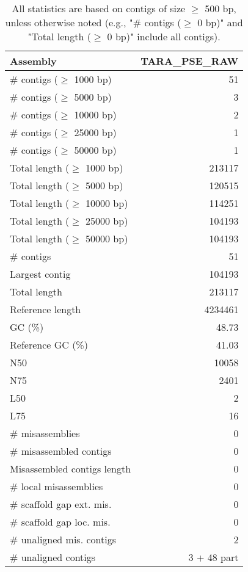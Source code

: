 \documentclass[12pt,a4paper]{article}
\begin{document}
\begin{table}[ht]
\begin{center}
\caption{All statistics are based on contigs of size $\geq$ 500 bp, unless otherwise noted (e.g., "\# contigs ($\geq$ 0 bp)" and "Total length ($\geq$ 0 bp)" include all contigs).}
\begin{tabular}{|l*{1}{|r}|}
\hline
Assembly & TARA\_PSE\_RAW \\ \hline
\# contigs ($\geq$ 1000 bp) & 51 \\ \hline
\# contigs ($\geq$ 5000 bp) & 3 \\ \hline
\# contigs ($\geq$ 10000 bp) & 2 \\ \hline
\# contigs ($\geq$ 25000 bp) & 1 \\ \hline
\# contigs ($\geq$ 50000 bp) & 1 \\ \hline
Total length ($\geq$ 1000 bp) & 213117 \\ \hline
Total length ($\geq$ 5000 bp) & 120515 \\ \hline
Total length ($\geq$ 10000 bp) & 114251 \\ \hline
Total length ($\geq$ 25000 bp) & 104193 \\ \hline
Total length ($\geq$ 50000 bp) & 104193 \\ \hline
\# contigs & 51 \\ \hline
Largest contig & 104193 \\ \hline
Total length & 213117 \\ \hline
Reference length & 4234461 \\ \hline
GC (\%) & 48.73 \\ \hline
Reference GC (\%) & 41.03 \\ \hline
N50 & 10058 \\ \hline
N75 & 2401 \\ \hline
L50 & 2 \\ \hline
L75 & 16 \\ \hline
\# misassemblies & 0 \\ \hline
\# misassembled contigs & 0 \\ \hline
Misassembled contigs length & 0 \\ \hline
\# local misassemblies & 0 \\ \hline
\# scaffold gap ext. mis. & 0 \\ \hline
\# scaffold gap loc. mis. & 0 \\ \hline
\# unaligned mis. contigs & 2 \\ \hline
\# unaligned contigs & 3 + 48 part \\ \hline

\end{tabular}
\end{center}
\end{table}
\end{document}

